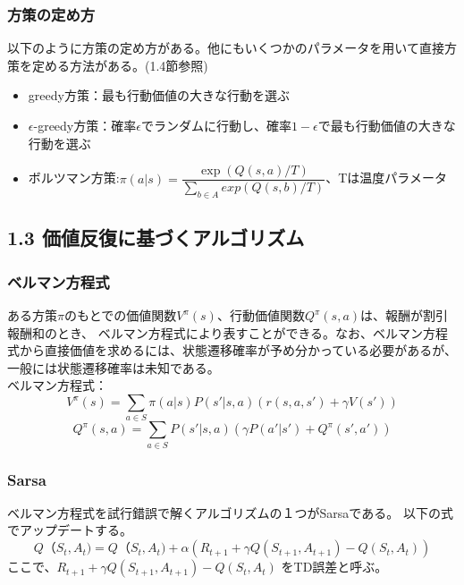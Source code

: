 \documentclass[]{jarticle}
\begin{document}
\subsubsection*{方策の定め方}
以下のように方策の定め方がある。他にもいくつかのパラメータを用いて直接方策を定める方法がある。(1.4節参照)
\begin{itemize}
	\item greedy方策：最も行動価値の大きな行動を選ぶ
	\item $\epsilon$-greedy方策：確率$\epsilon$でランダムに行動し、確率$1-\epsilon$で最も行動価値の大きな行動を選ぶ
	\item ボルツマン方策:$\pi(a|s)=\dfrac{\exp(Q(s,a)/T)}{\sum_{b\in{A}}exp(Q(s,b)/T)}$、Tは温度パラメータ
\end{itemize}
	

\subsection*{1.3 価値反復に基づくアルゴリズム}

\subsubsection*{ベルマン方程式}
ある方策$\pi$のもとでの価値関数$V^\pi(s)$、行動価値関数$Q^{\pi}(s,a)$は、報酬が割引報酬和のとき、
ベルマン方程式により表すことができる。なお、ベルマン方程式から直接価値を求めるには、状態遷移確率が予め分かっている必要があるが、一般には状態遷移確率は未知である。\\
ベルマン方程式：
\begin{equation*}
V^{\pi}(s) = \sum_{a\in{S}} \pi(a|s)  P(s' |s, a) (r(s,a,s') + \gamma V(s')) 
\end{equation*}
\begin{equation*}
Q^{\pi}(s,a) = \sum_{a\in{S}} P(s' |s, a) (\gamma P(a'|s')+ Q^{\pi}(s',a'))
\end{equation*}

\subsubsection*{Sarsa}
ベルマン方程式を試行錯誤で解くアルゴリズムの１つがSarsaである。
以下の式でアップデートする。
\begin{equation*}
Q（S_t, A_t) = Q（S_t, A_t) + \alpha (R_{t+1} + \gamma Q(S_{t+1},A_{t+1}) - Q(S_t, A_t))
\end{equation*}
ここで、$R_{t+1} + \gamma Q(S_{t+1},A_{t+1}) - Q(S_t, A_t)$ をTD誤差と呼ぶ。
\\
\end{document}
